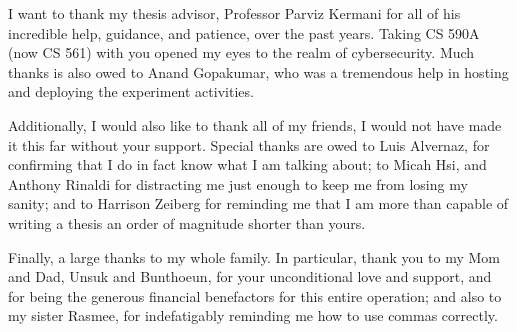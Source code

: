 \providecommand{\heading}[1]{\section{#1}}
\providecommand{\subheading}[1]{\subsection{#1}}

I want to thank my thesis advisor, Professor Parviz Kermani for all of his incredible help, guidance, and patience, over the past years. 
Taking CS 590A (now CS 561) with you opened my eyes to the realm of cybersecurity. 
Much thanks is also owed to Anand Gopakumar, who was a tremendous help in hosting and deploying the experiment activities. 
	
Additionally, I would also like to thank all of my friends, I would not have made it this far without your support. 
Special thanks are owed to Luis Alvernaz, for confirming that I do in fact know what I am talking about; 
to Micah Hsi, and Anthony Rinaldi for distracting me just enough to keep me from losing my sanity; 
and to Harrison Zeiberg for reminding me that I am more than capable of writing a thesis an order of magnitude shorter than yours. 

Finally, a large thanks to my whole family. 
In particular, thank you to my Mom and Dad, Unsuk and Bunthoeun, for your unconditional love and support, and for being the generous financial benefactors for this entire operation; 
and also to my sister Rasmee, for indefatigably reminding me how to use commas correctly.